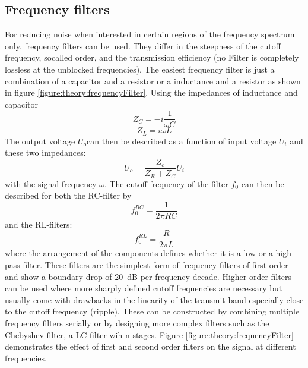             \subsection{Frequency filters}
            For reducing noise when interested in certain regions of the frequency spectrum only, frequency filters can be used. They differ in the steepness of the cutoff frequency, socalled order, and the transmission efficiency (no Filter is completely lossless at the unblocked frequencies). The easiest frequency filter is just a combination of a capacitor and a resistor or a inductance and a resistor as shown in figure \ref{figure:theory:frequencyFilter}. Using the impedances of inductance and capacitor
                \begin{equation*}
                    Z_C = -i\frac{1}{\omega C}
                \end{equation*}
                \begin{equation*}
                    Z_L = {i\omega L}
                \end{equation*} 
                The output voltage $U_o$can then be described as a function of input voltage $U_{i}$ and these two impedances:
                \begin{equation}
                    U_o = \frac{Z_c}{Z_R + Z_C} U_i
                \end{equation}
                with the signal frequency $\omega$. The cutoff frequency of the filter $f_0$ can then be described for both the RC-filter by
                \begin{equation}
                    f_0^{RC} = \frac{1}{2\pi R C}
                \end{equation}
                and the RL-filters:
                \begin{equation}
                    f_0^{RL} = \frac{R}{2\pi L}
                \end{equation}
                where the arrangement of the components defines whether it is a low or a high pass filter. These filters are the simplest form of frequency filters of first order and show a boundary drop of \SI{20}{\deci\bel} per frequency decade. Higher order filters can be used where more sharply defined cutoff frequencies are necessary but usually come with drawbacks in the linearity of the transmit band especially close to the cutoff frequency (ripple). These can be constructed by combining multiple frequency filters serially or by designing more complex filters such as the Chebyshev filter, a LC filter wih n stages. Figure \ref{figure:theory:frequencyFilter} demonstrates the effect of first and second order filters on the signal at different frequencies.

